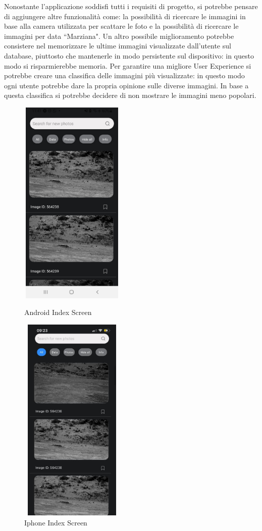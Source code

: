 \documentclass[a4paper,11pt]{article}
\begin{document}
Nonostante l'applicazione soddisfi tutti i requisiti di progetto, si potrebbe pensare di aggiungere altre funzionalit\`a come: la possibilit\`a di ricercare le immagini in base alla camera utilizzata per scattare le foto e la possibilit\`a di ricercare le immagini per data ``Marziana".
Un altro possibile miglioramento potrebbe consistere nel memorizzare le ultime immagini visualizzate dall'utente sul database, piuttosto che mantenerle in modo persistente sul dispositivo: in questo
modo si risparmierebbe memoria.
Per garantire una migliore User Experience si potrebbe creare una classifica delle immagini pi\`u visualizzate: in questo modo ogni utente potrebbe dare la propria opinione sulle diverse immagini. In base a questa
classifica si potrebbe decidere di non mostrare le immagini meno popolari.
\begin{figure}[h]
    \begin{minipage}[h]{0.47\textwidth}
        \centering
        \includegraphics[width=5cm, height=10cm]{images/immaginiAndroid/IndexScreen.jpg}
        \caption{\label{IndexScreenAndroid}Android Index Screen}
    \end{minipage}
    \hfill
    \begin{minipage}[h]{0.47\textwidth}
        \centering
        \includegraphics[width=5cm, height=10cm]{images/immaginiPhone/IndexScreen.jpeg}
        \caption{\label{IndexScreenAndroid}Iphone Index Screen}
    \end{minipage}
\end{figure}
\end{document}
